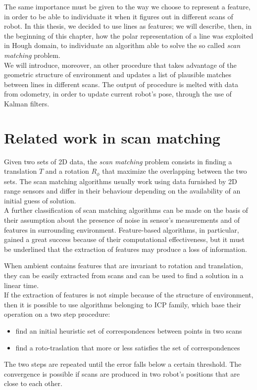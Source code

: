 \documentclass[a4paper, onecolumn]{report}
\begin{document}
The same importance must be given to the way we choose to represent a feature, in order to be able to individuate it when it figures out in different scans of robot. In this thesis, we decided to use lines as features; we will describe, then, in the beginning of this chapter, how the polar representation of a line was exploited in Hough domain, to individuate an algorithm able to solve the so called \emph{scan matching} problem. \\ 
We will introduce, moreover, an other procedure that takes advantage of the geometric structure of environment and updates a list of plausible matches between lines in different scans. The output of procedure is melted with data from odometry, in order to update current robot's pose, through the use of Kalman filters.

\section{Related work in scan matching}
Given two sets of 2D data, the \emph{scan matching} problem consists in finding a translation $T$ and a rotation $R_\phi$ that maximize the overlapping between the two sets. The scan matching algorithms usually work using data furnished by 2D range sensors and differ in their behaviour depending on the availability of an initial guess of solution. \\
A further classification of scan matching algorithms can be made on the basis of their assumption about the presence of noise in sensor's measurements and of features in surrounding environment. Feature-based algorithms, in particular, gained a great success because of their computational effectiveness, but it must be underlined that the extraction of features may produce a loss of information. 

When ambient contains features that are invariant to rotation and translation, they can be easily extracted from scans and can be used to find a solution in a linear time. \\
If the extraction of features is not simple because of the structure of environment, then it is possible to use algorithms belonging to ICP family, which base their operation on a two step procedure:
\begin{itemize}
	\item{find an initial heuristic set of correspondences between points in two scans}
	\item{find a roto-traslation that more or less satisfies the set of correspondences}
\end{itemize}
The two steps are repeated until the error falls below a certain threshold. The convergence is possible if scans are produced in two robot's positions that are close to each other.
\end{document}
